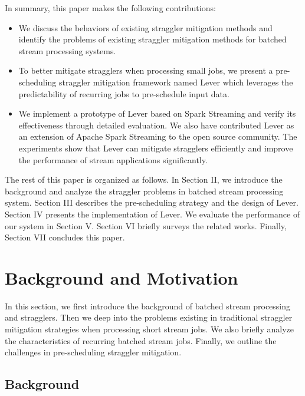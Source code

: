 \documentclass[10pt,conference,compsocconf,letterpaper]{IEEEtran}
\begin{document}
  In summary, this paper makes the following contributions:
\begin{itemize}
  \item We discuss the behaviors of existing straggler mitigation methods and identify the problems of existing straggler mitigation methods for batched stream processing systems.

  \item To better mitigate stragglers when processing small jobs, we present a pre-scheduling straggler mitigation framework named Lever which leverages the predictability of recurring jobs to pre-schedule input data.

  \item We implement a prototype of Lever based on Spark Streaming and verify its effectiveness through detailed evaluation. We also have contributed Lever as an extension of Apache Spark Streaming to the open source community. The experiments show that Lever can mitigate stragglers efficiently and improve the performance of stream applications significantly.
\end{itemize}

  The rest of this paper is organized as follows. In Section II, we introduce the background and analyze the straggler problems in batched stream processing system. Section III describes the pre-scheduling strategy and the design of Lever. Section IV presents the implementation of Lever. We evaluate the performance of our system in Section V. Section VI briefly surveys the related works. Finally, Section VII concludes this paper.

\section{Background and Motivation}

  In this section, we first introduce the background of batched stream processing and stragglers. Then we deep into the problems existing in traditional straggler mitigation strategies when processing short stream jobs. We also briefly analyze the characteristics of recurring batched stream jobs. Finally, we outline the challenges in pre-scheduling straggler mitigation.

\subsection{Background}
\end{document}
